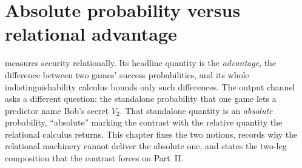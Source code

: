 %
%
%
%
%
\newcommand{\fib}{\mathrm{fiber}}
\newcommand{\guess}{\mathrm{guess}}
\newcommand{\cond}{\mathrm{cond}}
\newcommand{\Prexp}{\Pr\nolimits_{\mathrm{exp}}}
\newcommand{\jointfdist}{J}        %

\chapter{Absolute probability versus relational advantage}
\label{ch:absolute_pr}

\ssprove{} measures security relationally. Its headline quantity is the
\emph{advantage}, the difference between two games' success probabilities, and
its whole indistinguishability calculus bounds only such differences. The output
channel asks a different question: the standalone probability that one game lets
a predictor name Bob's secret $V_2$. That standalone quantity is an
\emph{absolute} probability, ``absolute'' marking the contrast with the relative
quantity the relational calculus returns. This chapter fixes the two notions,
records why the relational machinery cannot deliver the absolute one, and states
the two-leg composition that the contrast forces on Part~II.

